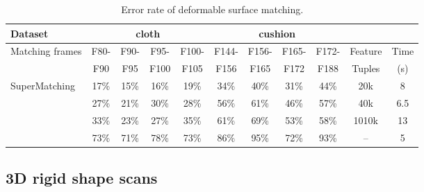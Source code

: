 \begin{table}
\centering
\tabcolsep=1pt
\setlength{\aboverulesep}{0pt}
\setlength{\belowrulesep}{0pt}
\caption{Error rate of deformable surface matching.}
\hspace{-5ex}
\label{tab:errorrate1}
\small
\begin{tabular}{l|c c c c | c c c c | c c}
\toprule
{Dataset}  & \multicolumn{4}{|c|}{ {cloth}} & \multicolumn{4}{c|}{ {cushion}} & & \\
\hline
 {Matching frames} &  {F80-}	&  {F90-}	& {F95-}	& {F100-} & {F144-} & {F156-}	& {F165-}	& {F172-} & {Feature}	& {Time}  \\
 {}                &  {F90 }    &  {F95 }   & {F100}    & {F105}  & {F156}  & {F165}    & {F172}    & {F188}  & {Tuples}    &  {(s)} \\
\hline
 {SuperMatching}   &  {17\%}    &  {15\%}	& {16\%} 	& {19\%}  & {34\%}	& {40\%}	& {31\%}	& {44\%}  &  {20k}	    &  {8}  \\
 {\cite{Zass08}}   & {27\%}	    & {21\%}	& {30\%}	& {28\%}  & {56\%}  & {61\%}    & {46\%}	& {57\%}   & {40k}	    & {6.5}  \\
{\cite{Duchenne09}} & {33\%}    & {23\%}    & {27\%}	& {35\%}  & {61\%}	& {69\%}	& {53\%}	& {58\%}   & {1010k}    & {13}  \\
 {\cite{Cour06}}   & {73\%}     & {71\%}	&  {78\%}	& {73\%}  & {86\%}  & {95\%}	& {72\%}	& {93\%}   & {--}       & {5}  \\
\bottomrule
\end{tabular}%
\end{table}%
%

\subsection{3D rigid shape scans}
\label{subsec:3DRigid}

